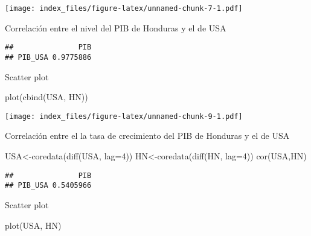 \documentclass[
]{book}
\newenvironment{Shaded}{\begin{snugshade}}{\end{snugshade}}
\newcommand{\AttributeTok}[1]{\textcolor[rgb]{0.77,0.63,0.00}{#1}}
\newcommand{\DecValTok}[1]{\textcolor[rgb]{0.00,0.00,0.81}{#1}}
\newcommand{\FunctionTok}[1]{\textcolor[rgb]{0.00,0.00,0.00}{#1}}
\newcommand{\NormalTok}[1]{#1}
\newcommand{\OtherTok}[1]{\textcolor[rgb]{0.56,0.35,0.01}{#1}}
\newcommand{\SpecialCharTok}[1]{\textcolor[rgb]{0.00,0.00,0.00}{#1}}
\newcommand{\StringTok}[1]{\textcolor[rgb]{0.31,0.60,0.02}{#1}}
\begin{document}
\texttt{[image: index\_files/figure-latex/unnamed-chunk-7-1.pdf]}

Correlación entre el nivel del PIB de Honduras y el de USA

\begin{Shaded}
\end{Shaded}

\begin{verbatim}
##               PIB
## PIB_USA 0.9775886
\end{verbatim}

Scatter plot

\begin{Shaded}
\begin{Highlighting}[]
\FunctionTok{plot}\NormalTok{(}\FunctionTok{cbind}\NormalTok{(USA, HN))}
\end{Highlighting}
\end{Shaded}

\texttt{[image: index\_files/figure-latex/unnamed-chunk-9-1.pdf]}

Correlación entre el la tasa de crecimiento del PIB de Honduras y el de USA

\begin{Shaded}
\begin{Highlighting}[]
\NormalTok{USA}\OtherTok{\textless{}{-}}\FunctionTok{coredata}\NormalTok{(}\FunctionTok{diff}\NormalTok{(USA, }\AttributeTok{lag=}\DecValTok{4}\NormalTok{))}
\NormalTok{HN}\OtherTok{\textless{}{-}}\FunctionTok{coredata}\NormalTok{(}\FunctionTok{diff}\NormalTok{(HN, }\AttributeTok{lag=}\DecValTok{4}\NormalTok{))}
\FunctionTok{cor}\NormalTok{(USA,HN)}
\end{Highlighting}
\end{Shaded}

\begin{verbatim}
##               PIB
## PIB_USA 0.5405966
\end{verbatim}

Scatter plot

\begin{Shaded}
\begin{Highlighting}[]
\FunctionTok{plot}\NormalTok{(USA, HN)}
\end{Highlighting}
\end{Shaded}
\end{document}

